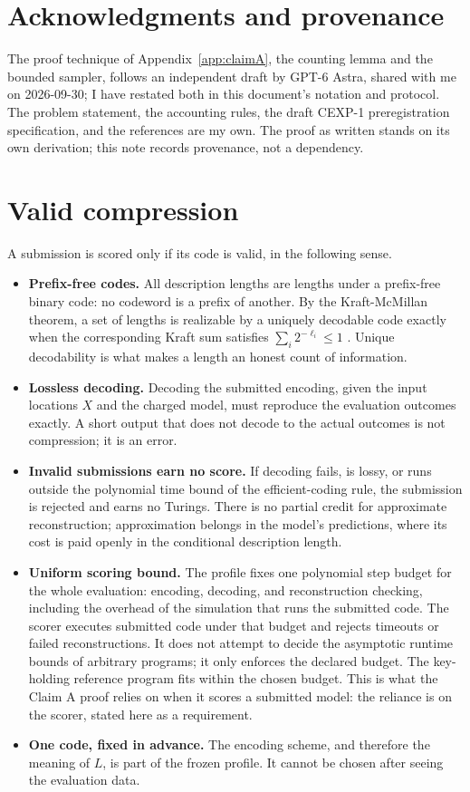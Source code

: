 \documentclass[11pt]{article}
\begin{document}
\section*{Acknowledgments and provenance}

The proof technique of Appendix~\ref{app:claimA}, the counting lemma and the bounded sampler, follows an independent draft by GPT-6 Astra, shared with me on 2026-09-30; I have restated both in this document's notation and protocol. The problem statement, the accounting rules, the draft CEXP-1 preregistration specification, and the references are my own. The proof as written stands on its own derivation; this note records provenance, not a dependency.

\appendix

\section{Valid compression}

A submission is scored only if its code is valid, in the following sense.

\begin{itemize}
\item \textbf{Prefix-free codes.} All description lengths are lengths under a prefix-free binary code: no codeword is a prefix of another. By the Kraft-McMillan theorem, a set of lengths is realizable by a uniquely decodable code exactly when the corresponding Kraft sum satisfies $\sum_i 2^{-\ell_i} \le 1$ \cite{coverthomas2006, shannon1948}. Unique decodability is what makes a length an honest count of information.
\item \textbf{Lossless decoding.} Decoding the submitted encoding, given the input locations $X$ and the charged model, must reproduce the evaluation outcomes exactly. A short output that does not decode to the actual outcomes is not compression; it is an error.
\item \textbf{Invalid submissions earn no score.} If decoding fails, is lossy, or runs outside the polynomial time bound of the efficient-coding rule, the submission is rejected and earns no Turings. There is no partial credit for approximate reconstruction; approximation belongs in the model's predictions, where its cost is paid openly in the conditional description length.
\item \textbf{Uniform scoring bound.} The profile fixes one polynomial step budget for the whole evaluation: encoding, decoding, and reconstruction checking, including the overhead of the simulation that runs the submitted code. The scorer executes submitted code under that budget and rejects timeouts or failed reconstructions. It does not attempt to decide the asymptotic runtime bounds of arbitrary programs; it only enforces the declared budget. The key-holding reference program fits within the chosen budget. This is what the Claim A proof relies on when it scores a submitted model: the reliance is on the scorer, stated here as a requirement.
\item \textbf{One code, fixed in advance.} The encoding scheme, and therefore the meaning of $L$, is part of the frozen profile. It cannot be chosen after seeing the evaluation data.
\end{itemize}
\end{document}
